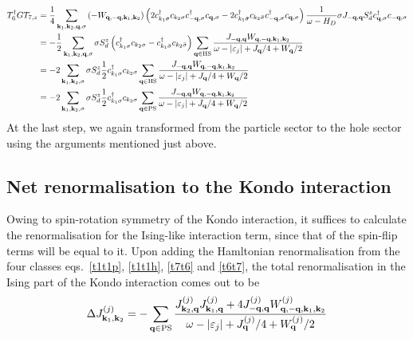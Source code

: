 \documentclass{revtex4-2}
\begin{document}
\begin{equation}\begin{aligned}\label{t6t7}
	T_{6}^\dagger G T_{7,z} &= \frac{1}{4}\sum_{{\bf k}_1,{\bf k}_2,{\bf q},\sigma} \left(- W_{{\bf q},-{\bf q},{\bf k}_1, {\bf k}_2}\right) \left(2 c^\dagger_{k_1\sigma}c_{k_2\sigma}c^\dagger_{-{\bf q},\sigma}c_{{\bf q},\sigma} - 2 c^\dagger_{k_1\bar\sigma}c_{k_2\bar\sigma}c^\dagger_{-{\bf q},\sigma}c_{{\bf q},\sigma}\right) \frac{1}{\omega - H_D} \sigma J_{-{\bf q},{\bf q}}S_d^z c^\dagger_{{\bf q},\sigma} c_{-{\bf q},\sigma}\\
			      &= -\frac{1}{2}\sum_{{\bf k}_1,{\bf k}_2,{\bf q},\sigma}\sigma S_d^z \left(c^\dagger_{k_1\sigma}c_{k_2\sigma} - c^\dagger_{k_1\bar\sigma}c_{k_2\bar\sigma}\right) \sum_{{\bf q} \in \text{HS}}\frac{J_{-{\bf q},{\bf q}} W_{{\bf q},-{\bf q},{\bf k}_1, {\bf k}_2}}{\omega - |\varepsilon_j| + J_{{\bf q}}/4 + W_{{\bf q}}/2} \\
			      &= -2\sum_{{\bf k}_1,{\bf k}_2,\sigma}\sigma S_d^z \frac{1}{2} c^\dagger_{k_1\sigma}c_{k_2\sigma} \sum_{{\bf q} \in \text{HS}}\frac{J_{-{\bf q},{\bf q}} W_{{\bf q},-{\bf q},{\bf k}_1, {\bf k}_2}}{\omega - |\varepsilon_j| + J_{{\bf q}}/4 + W_{{\bf q}}/2} \\
			      &= -2\sum_{{\bf k}_1,{\bf k}_2,\sigma}\sigma S_d^z \frac{1}{2} c^\dagger_{k_1\sigma}c_{k_2\sigma} \sum_{{\bf q} \in \text{PS}}\frac{J_{-{\bf q},{\bf q}} W_{{\bf q},-{\bf q},{\bf k}_1, {\bf k}_2}}{\omega - |\varepsilon_j| + J_{{\bf q}}/4 + W_{{\bf q}}/2} \\
\end{aligned}\end{equation}
At the last step, we again transformed from the particle sector to the hole sector using the arguments mentioned just above.

\subsection{Net renormalisation to the Kondo interaction}
Owing to spin-rotation symmetry of the Kondo interaction, it suffices to calculate the renormalisation for the Ising-like interaction term, since that of the spin-flip terms will be equal to it. Upon adding the Hamltonian renormalisation from the four classes eqs.~\ref{t1t1p}, \ref{t1t1h}, \ref{t7t6} and \ref{t6t7}, the total renormalisation in the Ising part of the Kondo interaction comes out to be
\begin{equation}\begin{aligned}
	\Delta J^{(j)}_{{\bf k}_1, {\bf k}_2} = -\sum_{{\bf q} \in \text{PS}} \frac{J^{(j)}_{{\bf k}_2,{\bf q}} J^{(j)}_{{\bf k}_1,{\bf q}} + 4J^{(j)}_{-{\bf q},{\bf q}} W^{(j)}_{{\bf q},-{\bf q},{\bf k}_1, {\bf k}_2}}{\omega - |\varepsilon_j| + J^{(j)}_{{\bf q}}/4 + W^{(j)}_{{\bf q}}/2}
\end{aligned}\end{equation}
\end{document}

